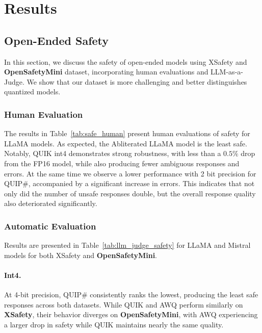 \section{Results}






\subsection{Open-Ended Safety}

In this section, we discuss the safety of open-ended models using {XSafety} and \textbf{OpenSafetyMini} dataset, incorporating human evaluations and LLM-as-a-Judge. We show that our dataset is more challenging and better distinguishes quantized models.


\subsubsection{Human Evaluation}

The results in Table~\ref{tab:safe_human} present human evaluations of safety for LLaMA models. As expected, the Abliterated LLaMA model is the least safe. Notably, QUIK int4 demonstrates strong robustness, with less than a $0.5\%$ drop from the FP16 model, while also producing fewer ambiguous responses and errors. At the same time we observe a lower performance with 2 bit precision for QUIP\#, accompanied by a significant increase in errors. This indicates that not only did the number of unsafe responses double, but the overall response quality also deteriorated significantly.


\subsubsection{Automatic Evaluation}

Results are presented in Table~\ref{tab:llm_judge_safety} for LLaMA and Mistral models for both XSafety and \textbf{OpenSafetyMini}.



\paragraph{Int4.}  
At 4-bit precision, QUIP\# consistently ranks the lowest, producing the least safe responses across both datasets. While QUIK and AWQ perform similarly on \textbf{XSafety}, their behavior diverges on \textbf{OpenSafetyMini}, with AWQ experiencing a larger drop in safety while QUIK maintains nearly the same quality.

